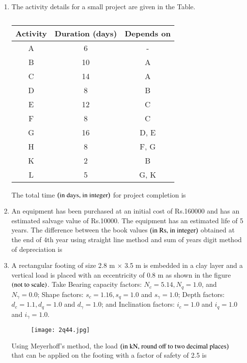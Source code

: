\documentclass[journal,12pt,onecolumn]{article}
\theoremstyle{remark}
\begin{document}
\begin{enumerate}
\item The activity details for a small project are given in the Table.
\begin{table}[H]
    \centering
    \begin{tabular}{|c|c|c|}
        \hline
        \textbf{Activity} & \textbf{Duration (days)} & \textbf{Depends on} \\ \hline
        A & 6 & - \\ \hline
        B & 10 & A \\ \hline
        C & 14 & A \\ \hline
        D & 8 & B \\ \hline
        E & 12 & C \\ \hline
        F & 8 & C \\ \hline
        G & 16 & D, E \\ \hline
        H & 8 & F, G \\ \hline
        K & 2 & B \\ \hline
        L & 5 & G, K \\ \hline
    \end{tabular}
    \caption{}
    \label{tab:q42}
\end{table}
The total time $\left(\text{in days, in integer}\right)$ for project completion is \underline{\hspace{2cm}}

\hfill{}

\item An equipment has been purchased at an initial cost of Rs.160000 and has an estimated salvage value of Rs.10000. The equipment has an estimated life of 5 years. The difference between the book values $\left(\text{in Rs, in integer}\right)$ obtained at the end of 4th year using straight line method and sum of years digit method of depreciation is \underline{\hspace{2cm}}

\hfill{}

\item A rectangular footing of size 2.8 m $\times$ 3.5 m is embedded in a clay layer and a vertical load is placed with an eccentricity of 0.8 m as shown in the figure  $\left(\text{not to scale}\right)$. Take Bearing capacity factors: $N_c = 5.14, N_q = 1.0$, and $N_{\gamma} = 0.0$; Shape factors: $s_c = 1.16, s_q = 1.0$ and $s_{\gamma}= 1.0$; Depth factors: $d_c = 1.1, d_q = 1.0$ and $d_{\gamma} = 1.0$; and Inclination factors: $i_c = 1.0$ and $i_q = 1.0$ and $i_{\gamma}= 1.0$.
\begin{figure}[H]
    \centering
    \texttt{[image: 2q44.jpg]}
    \caption{}
    \label{fig:q44}
\end{figure}
Using Meyerhoff's method, the load $\left(\text{in kN, round off to two decimal places}\right)$ that can be applied on the footing with a factor of safety of 2.5 is \underline{\hspace{2cm}}


\end{enumerate}
\end{document}
